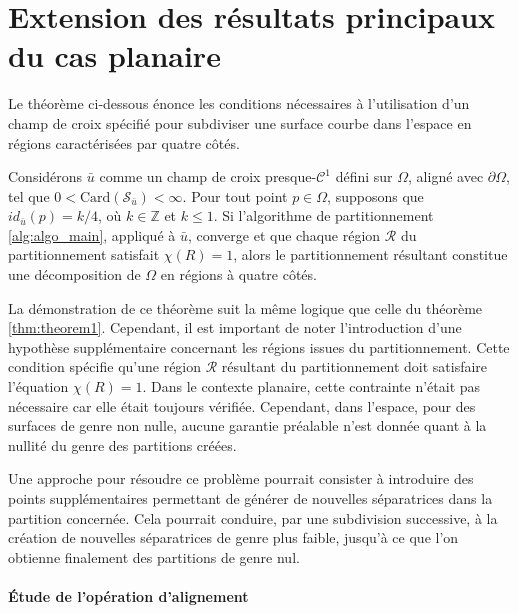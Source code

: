 \section{Extension des résultats principaux du cas planaire}

Le théorème ci-dessous énonce les conditions nécessaires à l'utilisation d'un champ de croix spécifié pour subdiviser une surface courbe dans l'espace en régions caractérisées par quatre côtés.

\begin{theorem}
\label{thm:theorem1_space}
Considérons $\bar{u}$ comme un champ de croix presque-$\mathcal{C}^1$ défini sur $\Omega$, aligné avec $\partial\Omega$, tel que $0 < \text{Card}(\mathcal{S}_{\bar{u}}) < \infty$. Pour tout point $p \in \Omega$, supposons que $id_{\bar{u}}(p) = k/4$, où $k \in \mathbb{Z}$ et $k \leq 1$. Si l'algorithme de partitionnement \ref{alg:algo_main}, appliqué à $\bar{u}$, converge et que chaque région $\mathcal{R}$ du partitionnement satisfait $\chi({R})=1$, alors le partitionnement résultant constitue une décomposition de $\Omega$ en régions à quatre côtés.
\end{theorem}

La démonstration de ce théorème suit la même logique que celle du théorème \ref{thm:theorem1}. Cependant, il est important de noter l'introduction d'une hypothèse supplémentaire concernant les régions issues du partitionnement. Cette condition spécifie qu'une région $\mathcal{R}$ résultant du partitionnement doit satisfaire l'équation $\chi({R})=1$. Dans le contexte planaire, cette contrainte n'était pas nécessaire car elle était toujours vérifiée. Cependant, dans l'espace, pour des surfaces de genre non nulle, aucune garantie préalable n'est donnée quant à la nullité du genre des partitions créées.

Une approche pour résoudre ce problème pourrait consister à introduire des points supplémentaires permettant de générer de nouvelles séparatrices dans la partition concernée. Cela pourrait conduire, par une subdivision successive, à la création de nouvelles séparatrices de genre plus faible, jusqu'à ce que l'on obtienne finalement des partitions de genre nul.



\paragraph{\'Etude de l'opération d'alignement}

